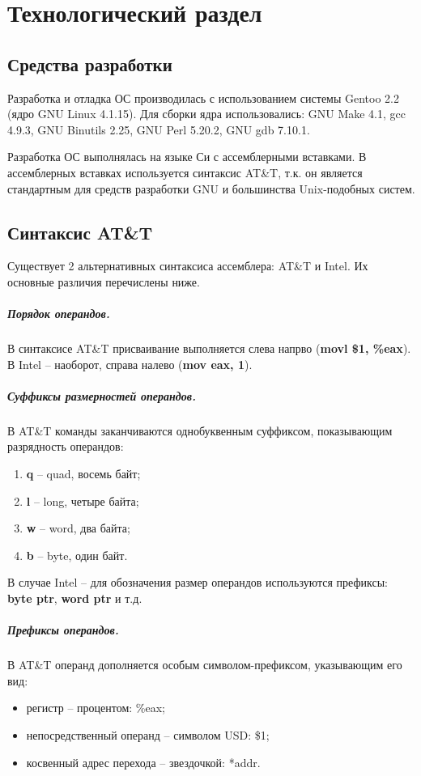 \chapter{Технологический раздел}
\label{cha:impl}

\section{Средства разработки}
Разработка и отладка ОС производилась с использованием системы Gentoo 2.2 (ядро
GNU Linux 4.1.15). Для сборки ядра использовались: GNU Make 4.1, gcc 4.9.3, GNU
Binutils 2.25, GNU Perl 5.20.2, GNU gdb 7.10.1.

Разработка ОС выполнялась на языке Си с ассемблерными вставками. В ассемблерных
вставках используется синтаксис AT\&T, т.к. он является стандартным для средств
разработки GNU и большинства Unix-подобных систем.

\section{Синтаксис AT\&T}
Существует 2 альтернативных синтаксиса ассемблера: AT\&T и Intel. Их основные
различия перечислены ниже.

\paragraph{Порядок операндов.} В синтаксисе AT\&T присваивание выполняется слева
напрво (\textbf{movl \$1, \%eax}). В Intel -- наоборот, справа налево (\textbf{mov eax, 1}).

\paragraph{Суффиксы размерностей операндов.} В AT\&T команды заканчиваются однобуквенным
суффиксом, показывающим разрядность операндов:
\begin{enumerate}[1.]
	\item \textbf{q} -- quad, восемь байт;
	\item \textbf{l} -- long, четыре байта;
	\item \textbf{w} -- word, два байта;
	\item \textbf{b} -- byte, один байт.
\end{enumerate}

В случае Intel -- для обозначения размер операндов используются префиксы: \textbf{byte ptr},
\textbf{word ptr} и т.д.

\paragraph{Префиксы операндов.} В AT\&T операнд дополняется особым символом-префиксом,
указывающим его вид:
\begin{itemize}
\item регистр -- процентом: \%eax;
\item непосредственный операнд -- символом USD: \$1;
\item косвенный адрес перехода -- звездочкой: *addr.
\end{itemize}


